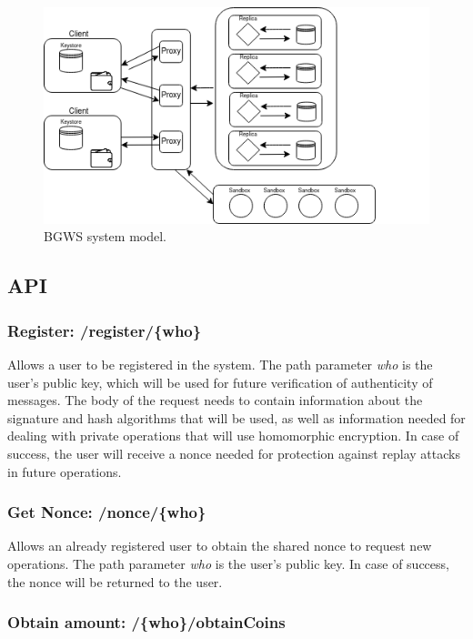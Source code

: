 \documentclass[10pt,journal,compsoc]{IEEEtran}
\begin{document}
	\begin{figure}[!ht]
		\includegraphics[width=\linewidth]{figures/System_Model.png}
		\caption{BGWS system model.}
	\end{figure}
	
	\subsection{API}
	
	\subsubsection{Register: \textbf{/register/\{who\}}}
	
	Allows a user to be registered in the system. The path parameter \textit{who} is the user's public key, which will be used for future verification of authenticity of messages. The body of the request needs to contain information about the signature and hash algorithms that will be used, as well as information needed for dealing with private operations that will use homomorphic encryption. In case of success, the user will receive a nonce needed for protection against replay attacks in future operations.
	
	\subsubsection{Get Nonce: \textbf{/nonce/\{who\}}}
	
	Allows an already registered user to obtain the shared nonce to request new operations. The path parameter \textit{who} is the user's public key. In case of success, the nonce will be returned to the user.
	
	\subsubsection{Obtain amount: \textbf{/\{who\}/obtainCoins}}
	
\end{document}
